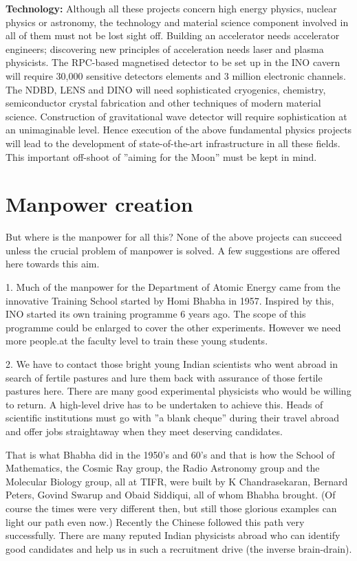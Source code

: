 \textbf{Technology:} Although all these projects concern high energy physics,
nuclear physics or astronomy, the technology and material science component
involved in all of them must not be lost sight off. Building an accelerator
needs accelerator engineers; discovering new principles of acceleration needs
laser and plasma physicists. The RPC-based magnetised detector to be set
up in the INO cavern will require 30,000 sensitive detectors elements and 3
million electronic channels. The NDBD, LENS and DINO will need sophisticated cryogenics, chemistry, semiconductor crystal fabrication and other
techniques of modern material science. Construction of gravitational wave
detector will require sophistication at an unimaginable level. Hence execution of the above fundamental physics projects will lead to the development
of state-of-the-art infrastructure in all these fields. This important off-shoot
of ”aiming for the Moon” must be kept in mind. 


\vspace{-.3cm}

\section*{Manpower creation} 


But where is the manpower for all this? None of the above projects can
succeed unless the crucial problem of manpower is solved. A few suggestions
are offered here towards this aim. 

1. Much of the manpower for the Department of Atomic Energy came
from the innovative Training School started by Homi Bhabha in 1957. Inspired by this, INO started its own training programme 6 years ago. The
scope of this programme could be enlarged to cover the other experiments.
However we need more people.at the faculty level to train these young students. 

2. We have to contact those bright young Indian scientists who went
abroad in search of fertile pastures and lure them back with assurance of
those fertile pastures here. There are many good experimental physicists who
would be willing to return. A high-level drive has to be undertaken to achieve
this. Heads of scientific institutions must go with ”a blank cheque” during
their travel abroad and offer jobs straightaway when they meet deserving
candidates. 


That is what Bhabha did in the 1950’s and 60’s and that is how the School
of Mathematics, the Cosmic Ray group, the Radio Astronomy group and the
Molecular Biology group, all at TIFR, were built by K Chandrasekaran, Bernard Peters, Govind Swarup and Obaid Siddiqui, all of whom Bhabha
brought. (Of course the times were very different then, but still those glorious
examples can light our path even now.) Recently the Chinese followed this
path very successfully. There are many reputed Indian physicists abroad who
can identify good candidates and help us in such a recruitment drive (the
inverse brain-drain). 


